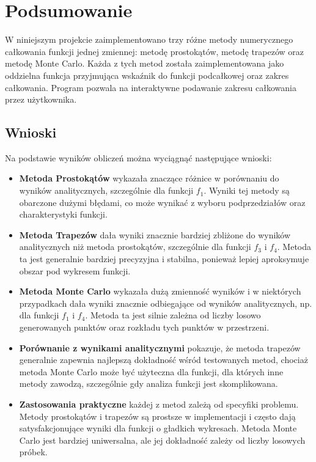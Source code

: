\documentclass{article}
\begin{document}
\section*{Podsumowanie}

W niniejszym projekcie zaimplementowano trzy różne metody numerycznego całkowania funkcji jednej zmiennej: metodę prostokątów, metodę trapezów oraz metodę Monte Carlo. Każda z tych metod została zaimplementowana jako oddzielna funkcja przyjmująca wskaźnik do funkcji podcałkowej oraz zakres całkowania. Program pozwala na interaktywne podawanie zakresu całkowania przez użytkownika.

\subsection*{Wnioski}

Na podstawie wyników obliczeń można wyciągnąć następujące wnioski:

\begin{itemize}
    \item \textbf{Metoda Prostokątów} wykazała znaczące różnice w porównaniu do wyników analitycznych, szczególnie dla funkcji \(f_1\). Wyniki tej metody są obarczone dużymi błędami, co może wynikać z wyboru podprzedziałów oraz charakterystyki funkcji.
    
    \item \textbf{Metoda Trapezów} dała wyniki znacznie bardziej zbliżone do wyników analitycznych niż metoda prostokątów, szczególnie dla funkcji \(f_3\) i \(f_4\). Metoda ta jest generalnie bardziej precyzyjna i stabilna, ponieważ lepiej aproksymuje obszar pod wykresem funkcji.
    
    \item \textbf{Metoda Monte Carlo} wykazała dużą zmienność wyników i w niektórych przypadkach dała wyniki znacznie odbiegające od wyników analitycznych, np. dla funkcji \(f_1\) i \(f_4\). Metoda ta jest silnie zależna od liczby losowo generowanych punktów oraz rozkładu tych punktów w przestrzeni.
    
    \item \textbf{Porównanie z wynikami analitycznymi} pokazuje, że metoda trapezów generalnie zapewnia najlepszą dokładność wśród testowanych metod, chociaż metoda Monte Carlo może być użyteczna dla funkcji, dla których inne metody zawodzą, szczególnie gdy analiza funkcji jest skomplikowana.
    
    \item \textbf{Zastosowania praktyczne} każdej z metod zależą od specyfiki problemu. Metody prostokątów i trapezów są prostsze w implementacji i często dają satysfakcjonujące wyniki dla funkcji o gładkich wykresach. Metoda Monte Carlo jest bardziej uniwersalna, ale jej dokładność zależy od liczby losowych próbek.
\end{itemize}
\end{document}

